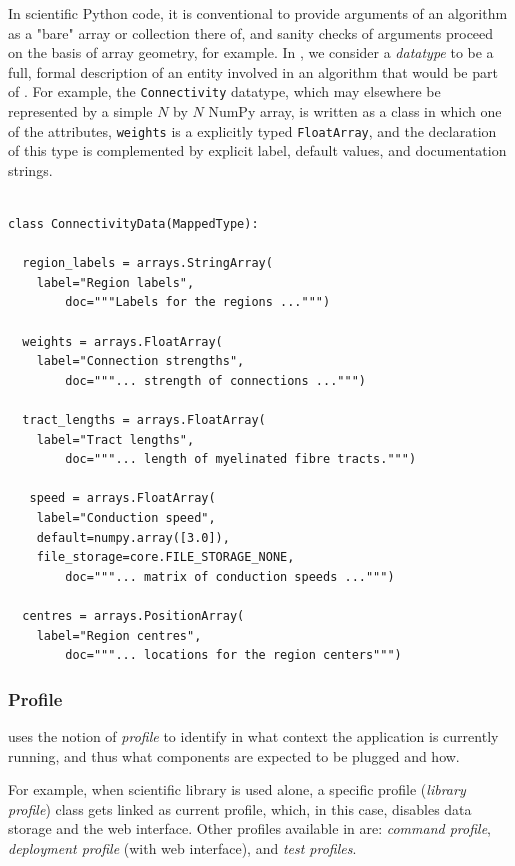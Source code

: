 In scientific Python code, it is conventional to provide arguments
of an algorithm as a "bare" array or collection there of, and sanity
checks of arguments proceed on the basis of array geometry, for example.
In \TVB, we consider a \textit{datatype} to be a full, formal description of 
an entity involved in an algorithm that would be part of \TVB. 
For example, the \texttt{Connectivity} datatype, which may elsewhere
be represented by a simple $N$ by $N$ NumPy array, is written as a class
in which one of the attributes, \texttt{weights} is a explicitly typed 
\texttt{FloatArray}, and the declaration of this type is complemented by
explicit label, default values, and documentation strings. 

\begin{lstlisting}

class ConnectivityData(MappedType):

  region_labels = arrays.StringArray( 
	label="Region labels", 
        doc="""Labels for the regions ...""")

  weights = arrays.FloatArray( 
	label="Connection strengths",
        doc="""... strength of connections ...""")

  tract_lengths = arrays.FloatArray( 
	label="Tract lengths",
        doc="""... length of myelinated fibre tracts.""")

   speed = arrays.FloatArray( 
	label="Conduction speed", 
	default=numpy.array([3.0]), 
	file_storage=core.FILE_STORAGE_NONE,
        doc="""... matrix of conduction speeds ...""")

  centres = arrays.PositionArray( 
	label="Region centres",
        doc="""... locations for the region centers""")

\end{lstlisting}

	\subsubsection{Profile}

\TVB uses the notion of \emph{profile} to identify in what context the application is currently running,
and thus what components are expected to be plugged and how.

For example, when \TVB scientific library is used alone, a specific profile (\emph{library profile}) class 
gets linked as current profile, which, in this case, disables data storage and the web interface. Other profiles available
in \TVB are: \emph{command profile}, \emph{deployment profile} (with web interface), and \emph{test profiles}.

